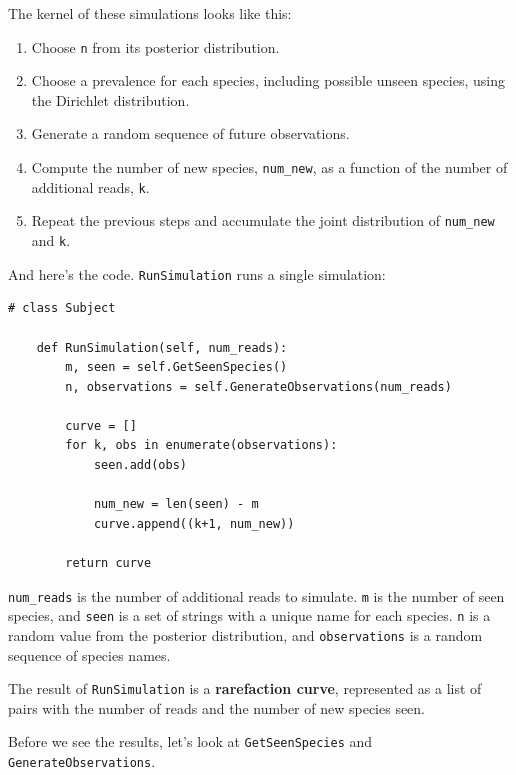 \documentclass[12pt]{book}
\begin{document}
The kernel of these simulations looks like this:

\begin{enumerate}

\item Choose {\tt n} from its posterior distribution.

\item Choose a prevalence for each species, including possible unseen
  species, using the Dirichlet distribution.

\item Generate a random sequence of future observations.

\item Compute the number of new species, \verb"num_new", as a function
  of the number of additional reads, {\tt k}.

\item Repeat the previous steps and accumulate the joint distribution
  of \verb"num_new" and {\tt k}.

\end{enumerate}

And here's the code.  {\tt RunSimulation} runs a single simulation:

\begin{verbatim}
# class Subject

    def RunSimulation(self, num_reads):
        m, seen = self.GetSeenSpecies()
        n, observations = self.GenerateObservations(num_reads)

        curve = []
        for k, obs in enumerate(observations):
            seen.add(obs)

            num_new = len(seen) - m
            curve.append((k+1, num_new))

        return curve
\end{verbatim}

\verb"num_reads" is the number of additional reads to simulate.
{\tt m} is the number of seen species, and {\tt seen} is a set of
strings with a unique name for each species.
{\tt n} is a random value from the posterior distribution, and
{\tt observations} is a random sequence of species names.

The result of {\tt RunSimulation} is a {\bf rarefaction curve},
represented as a list of pairs with the number of reads and
the number of new species seen.

Before we see the results, let's look at {\tt GetSeenSpecies} and
{\tt GenerateObservations}.
\end{document}
